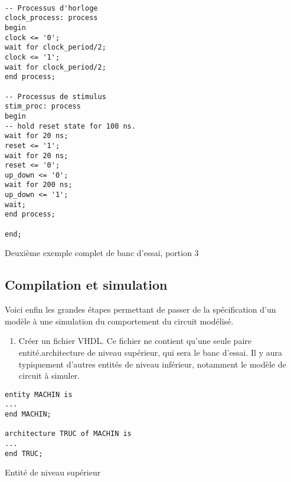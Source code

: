 \documentclass[11pt]{article}
\begin{document}
\begin{listing}[htbp]
\begin{verbatim}

-- Processus d'horloge
clock_process: process
begin
clock <= '0';
wait for clock_period/2;
clock <= '1';
wait for clock_period/2;
end process;

-- Processus de stimulus
stim_proc: process
begin
-- hold reset state for 100 ns.
wait for 20 ns;
reset <= '1';
wait for 20 ns;
reset <= '0';
up_down <= '0';
wait for 200 ns;
up_down <= '1';
wait;
end process;

end;
\end{verbatim}
\caption{Deuxième exemple complet de banc d'essai, portion 3}
\end{listing}


\subsection{Compilation et simulation}
\label{sec:org7761a9e}

Voici enfin les grandes étapes permettant de passer de la spécification d'un
modèle à une simulation du comportement du circuit modélisé. 

\begin{enumerate}
\item Créer un fichier VHDL. Ce fichier ne contient qu'une seule paire
entité.architecture de niveau supérieur, qui sera le banc
d'essai. Il y aura typiquement d'autres entités de niveau
inférieur, notamment le modèle de circuit à simuler.
\end{enumerate}

\begin{listing}[htbp]
\begin{verbatim}
entity MACHIN is
...
end MACHIN;

architecture TRUC of MACHIN is
...
end TRUC;
\end{verbatim}
\caption{Entité de niveau supérieur}
\end{listing}
\end{document}
